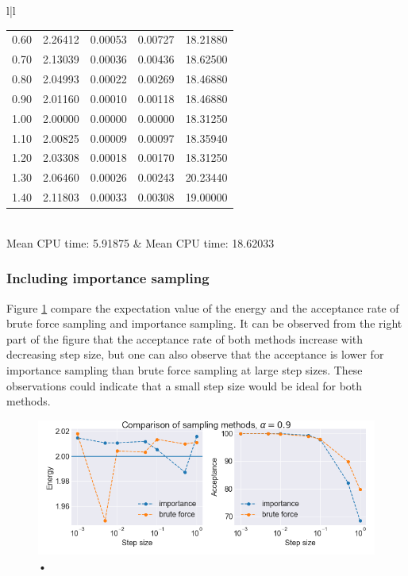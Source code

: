 \begin{table}[H]
\begin{tabular}{l|l}
\begin{tabular}{ccccc}
0.60 & 2.26412 & 0.00053 & 0.00727 & 18.21880\\
0.70 & 2.13039 & 0.00036 & 0.00436 & 18.62500\\
0.80 & 2.04993 & 0.00022 & 0.00269 & 18.46880\\
0.90 & 2.01160 & 0.00010 & 0.00118 & 18.46880\\
1.00 & 2.00000 & 0.00000 & 0.00000 & 18.31250\\
1.10 & 2.00825 & 0.00009 & 0.00097 & 18.35940\\
1.20 & 2.03308 & 0.00018 & 0.00170 & 18.31250\\
1.30 & 2.06460 & 0.00026 & 0.00243 & 20.23440\\
1.40 & 2.11803 & 0.00033 & 0.00308 & 19.00000\\ \hline
\end{tabular}\\
Mean CPU time: 5.91875 & Mean CPU time:  18.62033\\
\end{tabular}
\end{table}

\subsubsection{Including importance sampling}

Figure \ref{fig:comparing_sampling} compare the expectation value of the energy and the acceptance rate of brute force sampling and importance sampling. It can be observed from the right part of the figure that the acceptance rate of both methods increase with decreasing step size, but one can also observe that the acceptance is lower for importance sampling than brute force sampling at large step sizes. These observations could indicate that a small step size would be ideal for both methods. 

\begin{figure}[H]
\center
\includegraphics[width=\linewidth]{../Results/comparing_sampling}\caption{•}\label{fig:comparing_sampling}
\end{figure}

